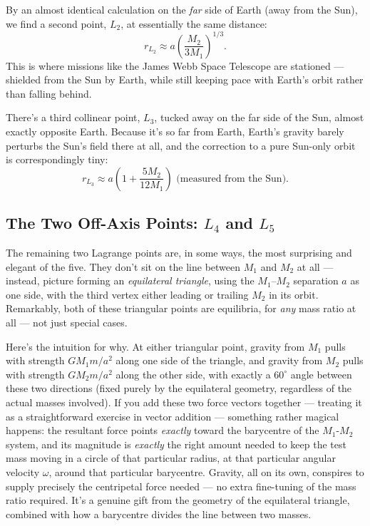 \documentclass[11pt]{article}
\begin{document}
By an almost identical calculation on the \emph{far} side of Earth (away from the Sun), we find a
second point, $L_2$, at essentially the same distance:
\[
\boxed{r_{L_2} \approx a\left(\frac{M_2}{3M_1}\right)^{1/3}.}
\]
This is where missions like the James Webb Space Telescope are stationed --- shielded from the
Sun by Earth, while still keeping pace with Earth's orbit rather than falling behind.

There's a third collinear point, $L_3$, tucked away on the far side of the Sun, almost exactly
opposite Earth. Because it's so far from Earth, Earth's gravity barely perturbs the Sun's field
there at all, and the correction to a pure Sun-only orbit is correspondingly tiny:
\[
r_{L_3} \approx a\left(1+\frac{5M_2}{12M_1}\right) \text{ (measured from the Sun)}.
\]

\subsection*{The Two Off-Axis Points: $L_4$ and $L_5$}

The remaining two Lagrange points are, in some ways, the most surprising and elegant of the five.
They don't sit on the line between $M_1$ and $M_2$ at all --- instead, picture forming an
\emph{equilateral triangle}, using the $M_1$--$M_2$ separation $a$ as one side, with the third
vertex either leading or trailing $M_2$ in its orbit. Remarkably, both of these triangular points
are equilibria, for \emph{any} mass ratio at all --- not just special cases.

Here's the intuition for why. At either triangular point, gravity from $M_1$ pulls with strength
$GM_1m/a^2$ along one side of the triangle, and gravity from $M_2$ pulls with strength
$GM_2m/a^2$ along the other side, with exactly a $60^\circ$ angle between these two directions
(fixed purely by the equilateral geometry, regardless of the actual masses involved). If you add
these two force vectors together --- treating it as a straightforward exercise in vector addition
--- something rather magical happens: the resultant force points \emph{exactly} toward the
barycentre of the $M_1$-$M_2$ system, and its magnitude is \emph{exactly} the right amount needed
to keep the test mass moving in a circle of that particular radius, at that particular angular
velocity $\omega$, around that particular barycentre. Gravity, all on its own, conspires to supply
precisely the centripetal force needed --- no extra fine-tuning of the mass ratio required. It's a
genuine gift from the geometry of the equilateral triangle, combined with how a barycentre divides
the line between two masses.
\end{document}
